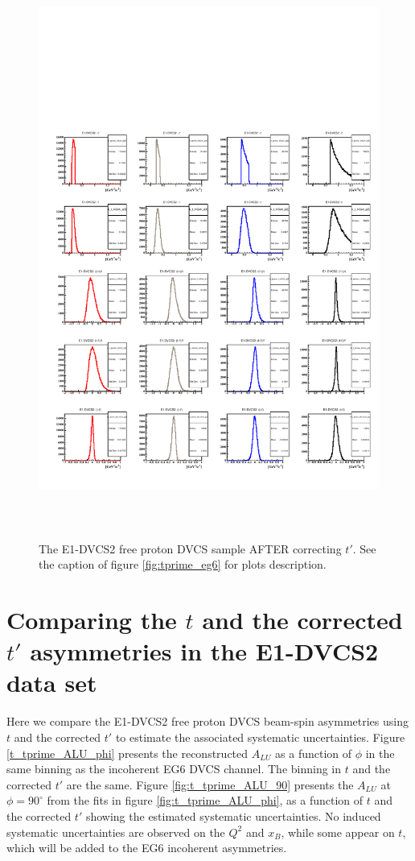 \documentclass[a4paper,11pt,twoside]{article}
\begin{document}
\begin{figure}[h!]
\centering
\includegraphics[height=19.0cm]{fig/after_corrections_E1-dvcs2-t_tprime_Incoh.pdf}
\caption{The E1-DVCS2 free proton DVCS sample AFTER correcting $t'$. See the 
caption of figure \ref{fig:tprime_eg6} for plots description.}
\label{fig:after_tprime_e1dvcs2}
\end{figure}





\section{Comparing the $t$ and the corrected $t'$ asymmetries in the E1-DVCS2 
data set}
Here we compare the E1-DVCS2 free proton DVCS beam-spin asymmetries using $t$ 
and the corrected $t'$ to estimate the associated systematic uncertainties.  
Figure \ref{t_tprime_ALU_phi} presents the reconstructed $A_{LU}$ as a function 
of $\phi$ in the same binning as the incoherent EG6 DVCS channel. The binning 
in $t$ and the corrected $t'$ are the same. Figure \ref{fig:t_tprime_ALU_90} 
presents the $A_{LU}$ at $\phi = 90^{\circ}$ from the fits in figure 
\ref{fig:t_tprime_ALU_phi}, as a function of $t$ and the corrected $t'$ showing 
the estimated systematic uncertainties. No induced systematic uncertainties are 
observed on the $Q^{2}$ and $x_B$, while some appear on $t$, which will be 
added to the EG6 incoherent asymmetries. 
\end{document}
